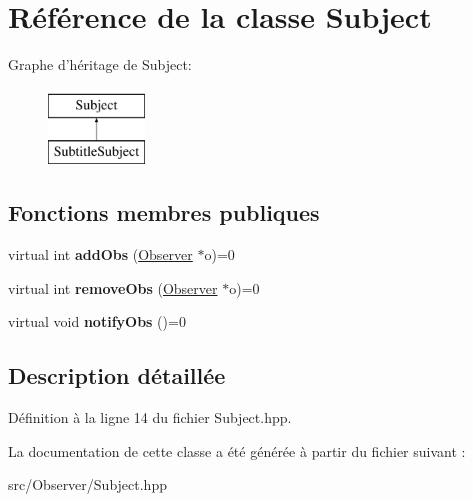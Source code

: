 \hypertarget{classSubject}{\section{Référence de la classe Subject}
\label{classSubject}
}
Graphe d'héritage de Subject\+:\begin{figure}[H]
\begin{center}
\leavevmode
\includegraphics[height=2.000000cm]{classSubject}
\end{center}
\end{figure}
\subsection*{Fonctions membres publiques}
\begin{DoxyCompactItemize}
\item 
\hypertarget{classSubject_aecac0cb2c69c2d18db0e9433f580bde7}{virtual int {\bfseries add\+Obs} (\hyperlink{classObserver}{Observer} $\ast$o)=0}\label{classSubject_aecac0cb2c69c2d18db0e9433f580bde7}

\item 
\hypertarget{classSubject_a4455d35d683c0005035121c7442b3a55}{virtual int {\bfseries remove\+Obs} (\hyperlink{classObserver}{Observer} $\ast$o)=0}\label{classSubject_a4455d35d683c0005035121c7442b3a55}

\item 
\hypertarget{classSubject_a421d620f3f93365bfd57cd1e9165e501}{virtual void {\bfseries notify\+Obs} ()=0}\label{classSubject_a421d620f3f93365bfd57cd1e9165e501}

\end{DoxyCompactItemize}


\subsection{Description détaillée}


Définition à la ligne 14 du fichier Subject.\+hpp.



La documentation de cette classe a été générée à partir du fichier suivant \+:\begin{DoxyCompactItemize}
\item 
src/\+Observer/Subject.\+hpp\end{DoxyCompactItemize}
